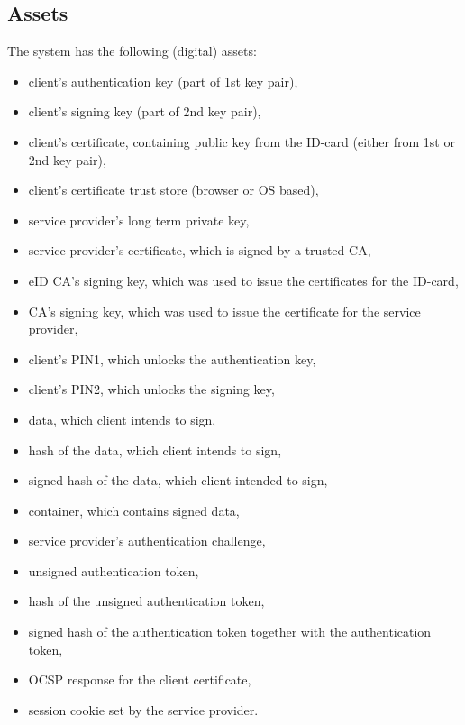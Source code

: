 \subsection{Assets}
The system has the following (digital) assets:
\begin{itemize}
\item client's authentication key (part of 1st key pair),
\item client's signing key (part of 2nd key pair),
\item client's certificate, containing public key from the ID-card (either from 1st or 2nd key pair),
\item client's certificate trust store (browser or OS based),
\item service provider's long term private key,
\item service provider's certificate, which is signed by a trusted CA,
\item eID CA's signing key, which was used to issue the certificates for the ID-card,
\item CA's signing key, which was used to issue the certificate for the service provider,
\item client's PIN1, which unlocks the authentication key,
\item client's PIN2, which unlocks the signing key,
\item data, which client intends to sign,
\item hash of the data, which client intends to sign,
\item signed hash of the data, which client intended to sign,
\item container, which contains signed data,
\item service provider's authentication challenge,
\item unsigned authentication token,
\item hash of the unsigned authentication token,
\item signed hash of the authentication token together with the authentication token,
\item OCSP response for the client certificate,
\item session cookie set by the service provider.
\end{itemize}




